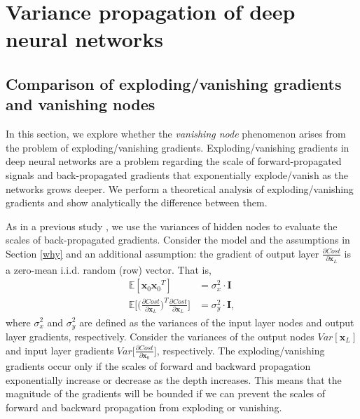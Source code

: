\chapter{Variance propagation of deep neural networks} \label{compare}

\section{Comparison of exploding/vanishing gradients and vanishing nodes} \label{comp:compare}

In this section, we explore whether the \textit{vanishing node} phenomenon arises from the problem of  exploding/vanishing gradients. Exploding/vanishing gradients in deep neural networks are a problem regarding the scale of forward-propagated signals and back-propagated gradients that exponentially explode/vanish as the networks grows deeper. We perform a theoretical analysis of exploding/vanishing gradients and show analytically the difference between them.



As in a previous study \cite{xavier}, we use the variances of hidden nodes to evaluate the scales of back-propagated gradients. Consider the model and the assumptions in Section \ref{why} and an additional assumption: the gradient of output layer $\frac{\partial Cost}{\partial \mathbf{x}_L}$ is a zero-mean i.i.d. random (row) vector.
That is,
\begin{equation}
    \begin{aligned}
    \mathbb{E}[\mathbf{x}_0{\mathbf{x}_0}^T] &= \sigma_x^2\cdot\mathbf{I} \\
    \mathbb{E}\Big[\Big(\frac{\partial Cost}{\partial \mathbf{x}_L}\Big)^T\frac{\partial Cost}{\partial \mathbf{x}_L}\Big] 
    &= \sigma_y^2\cdot\mathbf{I},
    \end{aligned}
\end{equation}
where $\sigma_x^2$ and $\sigma_y^2$ are defined as the variances of the input layer nodes and output layer gradients, respectively.
Consider %
the variances of the output nodes $Var[\mathbf{x}_L]$ and input layer gradients $Var\Big[\frac{\partial Cost}{\partial \mathbf{x}_0}\Big]$, respectively.
The exploding/vanishing gradients  occur only if the scales of forward and backward propagation exponentially increase or decrease as the depth increases.
This means that the magnitude of the gradients will be bounded if we can prevent the scales of forward and backward propagation from exploding or vanishing. 

